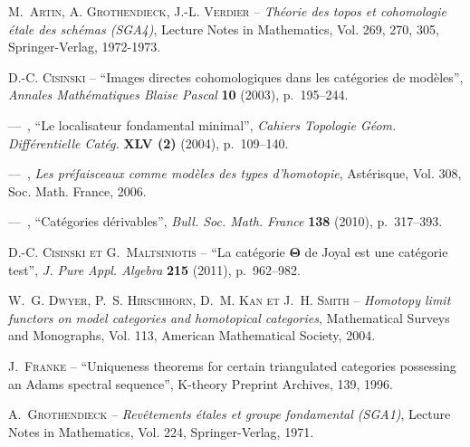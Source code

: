 \documentclass[francais]{smfart}
\theoremstyle{plain}
\theoremstyle{remark}
\theoremstyle{definition}
\numberwithin{equation}{thm}
\begin{document}
\backmatter



\providecommand{\bysame}{\leavevmode ---\ }
\providecommand{\og}{``}
\providecommand{\fg}{''}
\providecommand{\smfandname}{et}
\providecommand{\smfedsname}{\'eds.}
\providecommand{\smfedname}{\'ed.}
\providecommand{\smfmastersthesisname}{M\'emoire}
\providecommand{\smfphdthesisname}{Th\`ese}
\begin{thebibliography}{10}

{\scshape M.~Artin{, A. Grothendieck, J.-L. Verdier}} -- \emph{Th\'eorie des
  topos et cohomologie \'etale des sch\'emas \emph{(SGA4)}}, Lecture Notes in
  Mathematics, Vol. 269, 270, 305, Springer-Verlag, 1972-1973.

{\scshape D.-C. Cisinski} -- {\og Images directes cohomologiques dans les
  cat\'egories de mod\`eles\fg}, \emph{Annales Math\'ematiques Blaise Pascal}
  \textbf{10} (2003), p.~195--244.

\bysame , {\og Le localisateur fondamental minimal\fg}, \emph{Cahiers Topologie
  G\'eom. Dif\-f\'e\-ren\-tielle Cat\'eg.} \textbf{XLV (2)} (2004),
  p.~109--140.

\bysame , \emph{Les pr\'efaisceaux comme mod\`eles des types d'homotopie},
  Ast\'erisque, Vol. 308, Soc. Math. France, 2006.

\bysame , {\og Cat\'egories d\'erivables\fg}, \emph{Bull. Soc. Math. France}
  \textbf{138} (2010), p.~317--393.

{\scshape D.-C. Cisinski {\normalfont \smfandname} G.~Maltsiniotis} -- {\og La
  cat\'egorie {$\mathbf\Theta$} de {J}oyal est une cat\'egorie test\fg},
  \emph{J. Pure Appl. Algebra} \textbf{215} (2011), p.~962--982.

{\scshape W.~G. Dwyer, P.~S. Hirschhorn, D.~M. Kan {\normalfont \smfandname}
  J.~H. Smith} -- \emph{Homotopy limit functors on model categories and
  homotopical categories}, Mathematical Surveys and Monographs, Vol. 113,
  American Mathematical Society, 2004.

{\scshape J.~Franke} -- {\og Uniqueness theorems for certain triangulated
  categories possessing an {A}dams spectral sequence\fg}, K-theory Preprint
  Archives, 139, 1996.

{\scshape A.~Grothendieck} -- \emph{Rev\^etements \'etales et groupe
  fondamental {{\rm (SGA1)}}}, Lecture Notes in Mathematics, Vol. 224,
  Springer-Verlag, 1971.


\end{thebibliography}
\end{document}
